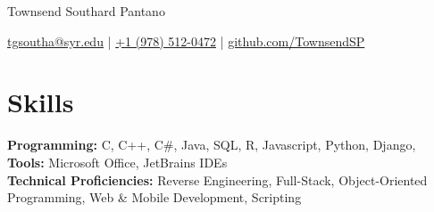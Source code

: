
\vspace{-70pt}
\centerline{\huge Townsend Southard Pantano}

\vspace{-1pt}

\centerline{\href{mailto:tgsoutha@syr.edu}{tgsoutha@syr.edu} | \href{tel:+19785120472}{+1 (978) 512-0472} | \href{https://github.com/TownsendSP}{github.com/TownsendSP}}
\vspace{-13.5pt}
\section*{Skills}
\textbf{Programming:} C, C++, C\#, Java, SQL, R, Javascript, Python, Django, 
%
\\

\textbf{Tools:} Microsoft Office, JetBrains IDEs
%
%
\\

\textbf{Technical Proficiencies:} Reverse Engineering, Full-Stack, Object-Oriented Programming, Web \& Mobile Development, Scripting
%
\vspace{-17pt}

